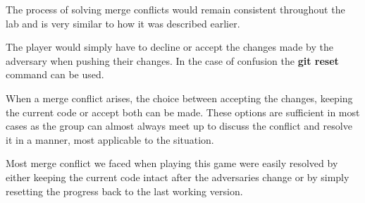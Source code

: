 \documentclass[twocolumn, 10pt]{article}
\begin{document}
The process of solving merge conflicts would remain consistent throughout the lab and is very similar to how it was described earlier.

The player would simply have to decline or accept the changes made by the adversary when pushing their changes. In the case of confusion the \textbf{git reset} command can be used.

When a merge conflict arises, the choice between accepting the changes, keeping the current code or accept both can be made. These options are sufficient in most cases as the group can almost always meet up to discuss the conflict and resolve it in a manner, most applicable to the situation.

Most merge conflict we faced when playing this game were easily resolved by either keeping the current code intact after the adversaries change or by simply resetting the progress back to the last working version.
\end{document}
